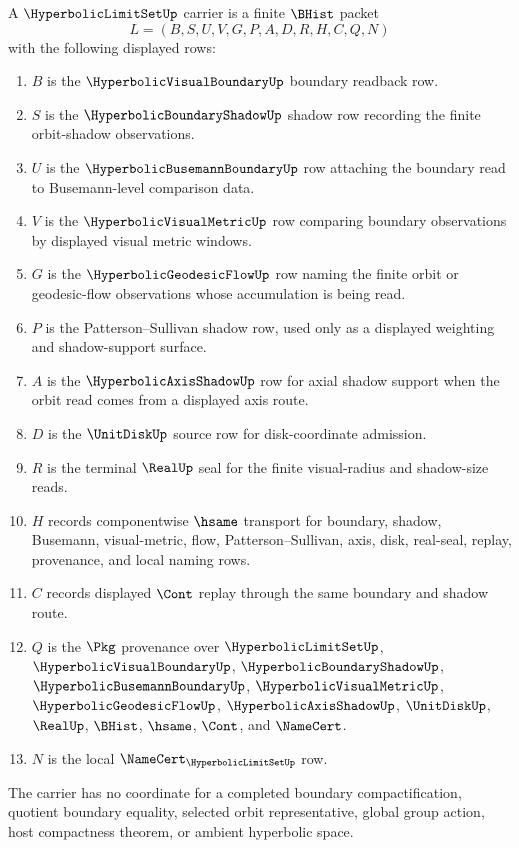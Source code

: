 \begin{definition}
\label{def:hyperbolic-limit-set-carrier}
A $\HyperbolicLimitSetUp$ carrier is a finite $\BHist$ packet
$$
L=(B,S,U,V,G,P,A,D,R,H,C,Q,N)
$$
with the following displayed rows:
\begin{enumerate}
\item $B$ is the $\HyperbolicVisualBoundaryUp$ boundary readback row.
\item $S$ is the $\HyperbolicBoundaryShadowUp$ shadow row recording the finite orbit-shadow observations.
\item $U$ is the $\HyperbolicBusemannBoundaryUp$ row attaching the boundary read to Busemann-level comparison data.
\item $V$ is the $\HyperbolicVisualMetricUp$ row comparing boundary observations by displayed visual metric windows.
\item $G$ is the $\HyperbolicGeodesicFlowUp$ row naming the finite orbit or geodesic-flow observations whose accumulation is being read.
\item $P$ is the Patterson--Sullivan shadow row, used only as a displayed weighting and shadow-support surface.
\item $A$ is the $\HyperbolicAxisShadowUp$ row for axial shadow support when the orbit read comes from a displayed axis route.
\item $D$ is the $\UnitDiskUp$ source row for disk-coordinate admission.
\item $R$ is the terminal $\RealUp$ seal for the finite visual-radius and shadow-size reads.
\item $H$ records componentwise $\hsame$ transport for boundary, shadow, Busemann, visual-metric, flow, Patterson--Sullivan, axis, disk, real-seal, replay, provenance, and local naming rows.
\item $C$ records displayed $\Cont$ replay through the same boundary and shadow route.
\item $Q$ is the $\Pkg$ provenance over $\HyperbolicLimitSetUp$, $\HyperbolicVisualBoundaryUp$, $\HyperbolicBoundaryShadowUp$, $\HyperbolicBusemannBoundaryUp$, $\HyperbolicVisualMetricUp$, $\HyperbolicGeodesicFlowUp$, $\HyperbolicAxisShadowUp$, $\UnitDiskUp$, $\RealUp$, $\BHist$, $\hsame$, $\Cont$, and $\NameCert$.
\item $N$ is the local $\NameCert_{\HyperbolicLimitSetUp}$ row.
\end{enumerate}
The carrier has no coordinate for a completed boundary compactification, quotient boundary equality, selected orbit representative, global group action, host compactness theorem, or ambient hyperbolic space.
\end{definition}

